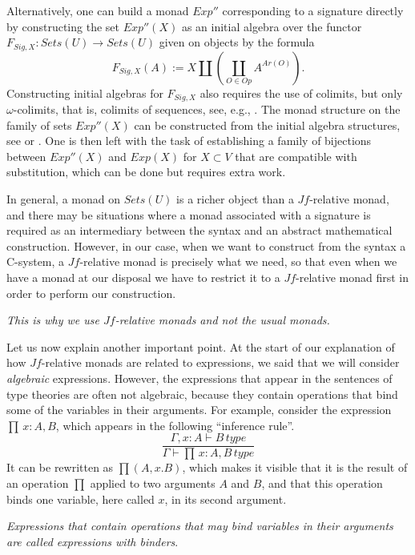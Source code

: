 \documentclass[onecolumn,12pt]{amsart}
\numberwithin{proposition}{subsection}
\newcommand{\sr}{\rightarrow}
\begin{document}
Alternatively, one can build a monad $Exp''$ corresponding to a signature
directly by constructing the set $Exp''(X)$ as an initial algebra over the
functor $F_{Sig,X}:Sets(U)\sr Sets(U)$ given on objects by the formula
%
$$F_{Sig,X}(A):=X\coprod(\coprod_{O\in Op}A^{Ar(O)}).$$
%
Constructing initial algebras for $F_{Sig,X}$ also requires the use of
colimits, but only $\omega$-colimits, that is, colimits of sequences, see,
e.g., \cite{Adamek1974}. The monad structure on the family of sets $Exp''(X)$
can be constructed from the initial algebra structures, see \cite{Barr1970} or
\cite[Th.3, p.~161]{MatthesUustalu}. One is then left with the task of
establishing a family of bijections between $Exp''(X)$ and $Exp(X)$ for
$X\subset V$ that are compatible with substitution, which can be done but
requires extra work.

In general, a monad on $Sets(U)$ is a richer object than a $Jf$-relative monad,
and there may be situations where a monad associated with a signature is
required as an intermediary between the syntax and an abstract mathematical
construction. However, in our case, when we want to construct from the syntax a
C-system, a $Jf$-relative monad is precisely what we need, so that even when we
have a monad at our disposal we have to restrict it to a $Jf$-relative monad
first in order to perform our construction.

{\em This is why we use $Jf$-relative monads and not the usual monads.}

Let us now explain another important point. At the start of our
explanation of how $Jf$-relative monads are related to expressions, we said
that we will consider {\em algebraic} expressions. However, the expressions
that appear in the sentences of type theories are often not algebraic, because
they contain operations that bind some of the variables in their
arguments. For example, consider the expression $\prod\,x:A,B$, which appears in
the following ``inference rule''.
%
\begin{equation}
\label{2017.03.02.eq1}
\frac{\Gamma,x:A\vdash B\,type}{\Gamma\vdash \prod\,x:A,B\,type}
\end{equation}%
%
It can be rewritten as $\prod(A,x.B)$, which makes it
visible that it is the result of an operation $\prod$ applied to two arguments
$A$ and $B$, and that this operation binds one variable, here called $x$, in its
second argument.

{\em Expressions that contain operations that may bind variables in their
  arguments are called expressions with binders}.
 
\end{document}
